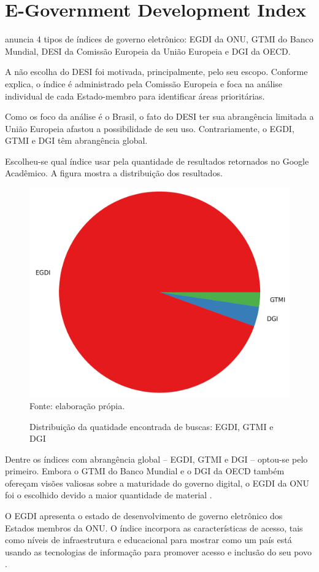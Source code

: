 \chapter{E-Government Development Index}

\cite{martinez2022egovernment} anuncia 4 tipos de índices de governo eletrônico: EGDI da ONU, GTMI do Banco Mundial, DESI da Comissão Europeia da União Europeia e DGI da OECD.

A não escolha do DESI foi motivada, principalmente, pelo seu escopo. Conforme \cite{desi_2022} explica, o índice é administrado pela Comissão Europeia e foca na análise individual de cada Estado-membro para identificar áreas prioritárias.

Como os foco da análise é o Brasil, o fato do DESI ter sua abrangência limitada a União Europeia afastou a possibilidade de seu uso. Contrariamente, o EGDI, GTMI e DGI têm abrangência global.

Escolheu-se qual índice usar pela quantidade de resultados retornados no Google Acadêmico. A figura mostra a distribuição dos resultados.

\begin{figure}[H]
	\centering
	\caption{Distribuição da quatidade encontrada de buscas: EGDI, GTMI e DGI}
	\includegraphics[width=0.6\linewidth]{figuras/indices/indices_google_academico}
	\label{fig:indices_google_academico}
	\\ \footnotesize{Fonte: elaboração própia.}
\end{figure}

Dentre os índices com abrangência global – EGDI, GTMI e DGI – optou-se pelo primeiro. Embora o GTMI do Banco Mundial e o DGI da OECD também ofereçam visões valiosas sobre a maturidade do governo digital, o EGDI da ONU foi o escolhido devido a maior quantidade de material .

O EGDI apresenta o estado de desenvolvimento de governo eletrônico dos Estados membros da ONU. O índice incorpora as características de acesso, tais como níveis de infraestrutura e educacional para mostrar como um país está usando as tecnologias de informação para promover acesso e inclusão do seu povo \cite{ONU_EGDI}.

